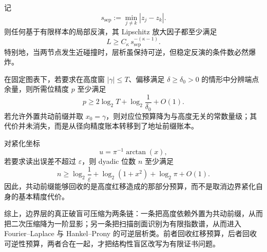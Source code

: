 \begin{corollary}[碰撞极限下的不适定性]\label{cor:unit-circle-comoving-collision-instability}
记
\[
s_{\mathrm{sep}}:=\min_{j\neq k}|z_j-z_k|.
\]
则任何基于有限样本的局部反演，其 Lipschitz 放大因子都至少满足
\[
L\ge C_\kappa\,s_{\mathrm{sep}}^{-(\kappa-1)}.
\]
特别地，当两节点发生近碰撞时，层析虽保持可逆，但稳定反演的条件数必然爆炸。
\end{corollary}

\begin{proposition}[固定图表的位预算与共动前缀收益]\label{prop:unit-circle-comoving-bit-budget}
在固定图表下，若要求在高度窗 \(|\gamma|\le T\)、偏移满足 \(\delta\ge\delta_0>0\) 的情形中分辨端点余量，则所需位精度 \(p\) 至少满足
\[
p\ge 2\log_2 T+\log_2\frac1{\delta_0}+O(1).
\]
若允许外置共动前缀并取 \(x_0=\gamma\)，则对应位预算降为与高度无关的常数量级；其代价并未消失，而是从径向精度账本转移到了地址前缀账本。
\end{proposition}

\begin{proposition}[紧化读出的径向位复杂度]\label{prop:unit-circle-comoving-radial-bit-complexity}
对紧化坐标
\[
u=\pi^{-1}\arctan(x),
\]
若要求读出误差不超过 \(\varepsilon\)，则 dyadic 位数 \(n\) 至少满足
\[
n\ge \log_2\frac1\varepsilon+\log_2(1+x^2)+\log_2\pi+O(1).
\]
因此，共动前缀能够回收的是高度红移造成的那部分预算，而不是取消边界紧化自身的基本精度代价。
\end{proposition}

综上，边界层的真正破盲可压缩为两条链：一条把高度依赖外置为共动前缀，从而把二次压缩降为一阶显影；另一条把扫描剖面识别为有限指数谱，从而进入 Fourier--Laplace 与 Hankel--Prony 的可逆层析类。前者回收红移预算，后者回收可逆性预算，两者合在一起，才把结构性盲区改写为有限证书问题。
